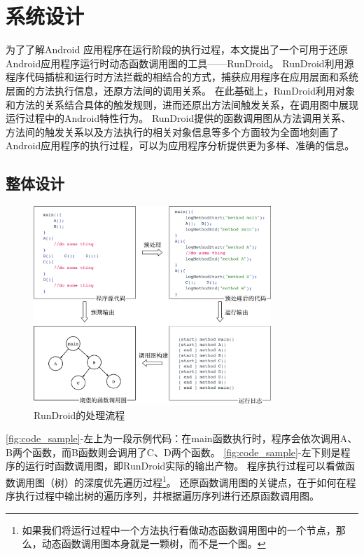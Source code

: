 \chapter{系统设计}
\label{chp:design}





为了了解Android 应用程序在运行阶段的执行过程，本文提出了一个可用于还原Android应用程序运行时动态函数调用图的工具——RunDroid。
RunDroid利用源程序代码插桩和运行时方法拦截的相结合的方式，捕获应用程序在应用层面和系统层面的方法执行信息，还原方法间的调用关系。
在此基础上，RunDroid利用对象和方法的关系结合具体的触发规则，进而还原出方法间触发关系，在调用图中展现运行过程中的Android特性行为。
RunDroid提供的函数调用图从方法调用关系、方法间的触发关系以及方法执行的相关对象信息等多个方面较为全面地刻画了Android应用程序的执行过程，可以为应用程序分析提供更为多样、准确的信息。


\section{整体设计}



\begin{figure}[!ht]
	\centering
	\includegraphics[width=0.8\textwidth]{./Figures/code-sample.png}
	\caption{RunDroid的处理流程}
	\label{fig:code_sample}
\end{figure}


\autoref{fig:code_sample}-左上为一段示例代码：在main函数执行时，程序会依次调用A、B两个函数，而B函数则会调用了C、D两个函数。
\autoref{fig:code_sample}-左下则是程序的运行时函数调用图，即RunDroid实际的输出产物。
程序执行过程可以看做函数调用图（树）的深度优先遍历过程\footnote{如果我们将运行过程中一个方法执行看做动态函数调用图中的一个节点，那么，动态函数调用图本身就是一颗树，而不是一个图。}。
还原函数调用图的关键点，在于如何在程序执行过程中输出树的遍历序列，并根据遍历序列进行还原函数调用图。

